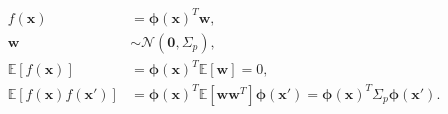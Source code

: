 \begin{equation}
\label{eq:bayesianlinearmodelgaussianprocess}
\begin{align*}
f(\mathbf{x}) &= \boldsymbol{\phi(\mathbf{x})}^T \mathbf{w}, \\
\mathbf{w}	  & \sim \mathcal{N} (\mathbf{0}, \Sigma_p), \\
\mathbb{E}[f(\mathbf{x}) ] &= \boldsymbol{\phi(\mathbf{x})}^T
\mathbb{E}[\mathbf{w}] = 0, \\
\mathbb{E}[f(\mathbf{x}) f(\mathbf{x'})] &= \boldsymbol{\phi(\mathbf{x})}^T
\mathbb{E}[\mathbf{ww}^T] \boldsymbol{\phi(\mathbf{x'})} =
\boldsymbol{\phi(\mathbf{x})}^T \Sigma_p \boldsymbol{\phi(\mathbf{x'})}.
\end{align*}
\end{equation}